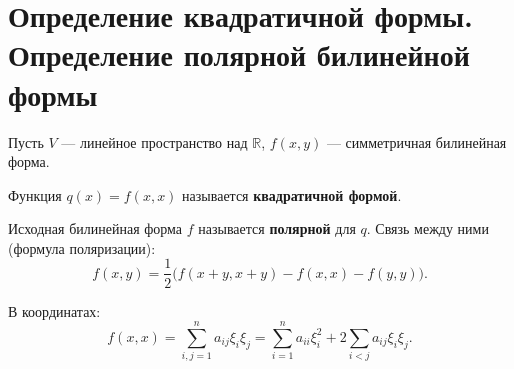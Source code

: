 \section{Определение квадратичной формы. Определение полярной билинейной формы}

\begin{definition}
Пусть $V$ --- линейное пространство над $\mathbb{R}$, $f(x, y)$ --- симметричная билинейная форма.

Функция $q(x) = f(x, x)$ называется \textbf{квадратичной формой}.

Исходная билинейная форма $f$ называется \textbf{полярной} для $q$. Связь между ними (формула поляризации):
\[
f(x, y) = \frac{1}{2}\bigl(f(x+y, x+y) - f(x, x) - f(y, y)\bigr).
\]

В координатах:
\[
f(x, x) = \sum_{i,j=1}^{n} a_{ij} \xi_i \xi_j = \sum_{i=1}^{n} a_{ii} \xi_i^2 + 2 \sum_{i < j} a_{ij} \xi_i \xi_j.
\]
\end{definition}
